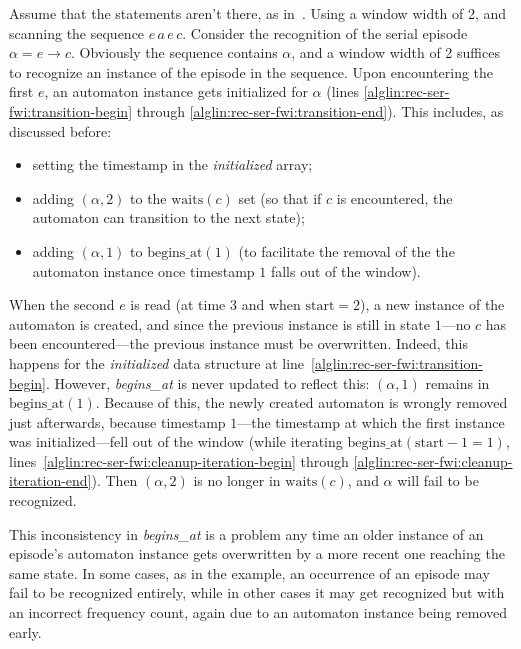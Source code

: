 Assume that the statements aren't there, as in~\cite{mannila1997discovery}. Using a window width of 2, and scanning the sequence $ e \, a \, e \, c $. Consider the recognition of the serial episode $ \alpha = e \to c $. Obviously the sequence contains $ \alpha $, and a window width of 2 suffices to recognize an instance of the episode in the sequence. Upon encountering the first $ e $, an automaton instance gets initialized for $ \alpha $ (lines \ref{alglin:rec-ser-fwi:transition-begin} through \ref{alglin:rec-ser-fwi:transition-end}). This includes, as discussed before:
\begin{itemize}
\item setting the timestamp in the \emph{initialized} array;
\item adding $ (\alpha, 2) $ to the $ \text{waits}(c) $ set (so that if $ c $ is encountered, the automaton can transition to the next state);
\item adding $ (\alpha, 1) $ to $ \text{begins\_at}(1) $ (to facilitate the removal of the the automaton instance once timestamp $ 1 $ falls out of the window).
\end{itemize}

When the second $ e $ is read (at time $ 3 $ and when $ \text{start} = 2 $), a new instance of the automaton is created, and since the previous instance is still in state $ 1 $---no $ c $ has been encountered---the previous instance must be overwritten. Indeed, this happens for the \emph{initialized} data structure at line~\ref{alglin:rec-ser-fwi:transition-begin}. However, \emph{begins\_at} is never updated to reflect this: $ (\alpha, 1) $ remains in $ \text{begins\_at}(1) $. Because of this, the newly created automaton is wrongly removed just afterwards, because timestamp $ 1 $---the timestamp at which the first instance was initialized---fell out of the window (while iterating $ \text{begins\_at}(\text{start} - 1 = 1) $, lines~\ref{alglin:rec-ser-fwi:cleanup-iteration-begin} through \ref{alglin:rec-ser-fwi:cleanup-iteration-end}). Then $ (\alpha, 2) $ is no longer in $ \text{waits}(c) $, and $ \alpha $ will fail to be recognized.

This inconsistency in \emph{begins\_at} is a problem any time an older instance of an episode's automaton instance gets overwritten by a more recent one reaching the same state. In some cases, as in the example, an occurrence of an episode may fail to be recognized entirely, while in other cases it may get recognized but with an incorrect frequency count, again due to an automaton instance being removed early.

